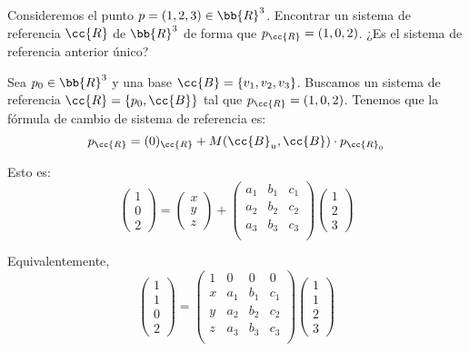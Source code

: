 \begin{ejercicio}
    Consideremos el punto $p = (1,2,3) \in \bb{R}^3$. Encontrar un sistema de referencia $\cc{R}$ de $\bb{R}^3$ de forma que $p_{\cc{R}} = (1,0, 2)$. ¿Es el sistema de referencia anterior único?

    Sea $p_0\in \bb{R}^3$ y una base $\cc{B}=\{v_1,v_2,v_3\}$. Buscamos un sistema de referencia $\cc{R}=\{p_0,\cc{B}\}$ tal que $p_{\cc{R}} = (1,0, 2)$. Tenemos que la fórmula de cambio de sistema de referencia es:
    \begin{equation*}
        p_{\cc{R}} = (0)_{\cc{R}} + M(\cc{B}_u,\cc{B})\cdot p_{\cc{R}_0}
    \end{equation*}

    Esto es:
    \begin{equation*}
        \left(\begin{array}{c}
            1 \\ 0 \\ 2
        \end{array}\right) = 
        \left(\begin{array}{c}
            x \\ y \\ z
        \end{array}\right) + \left(\begin{array}{ccc}
            a_1 & b_1 & c_1 \\
            a_2 & b_2 & c_2 \\
            a_3 & b_3 & c_3 \\
        \end{array}\right)
        \left(\begin{array}{c}
            1 \\ 2 \\ 3
        \end{array}\right)
    \end{equation*}

    Equivalentemente, 
    \begin{equation*}
        \left(\begin{array}{c}
            1 \\\hline 1 \\ 0 \\ 2
        \end{array}\right) = \left(\begin{array}{c|ccc}
            1 & 0 & 0 & 0 \\ \hline
            x & a_1 & b_1 & c_1 \\
            y & a_2 & b_2 & c_2 \\
            z & a_3 & b_3 & c_3 \\
        \end{array}\right)
        \left(\begin{array}{c}
            1 \\\hline 1 \\ 2 \\ 3
        \end{array}\right)
    \end{equation*}



\end{ejercicio}
